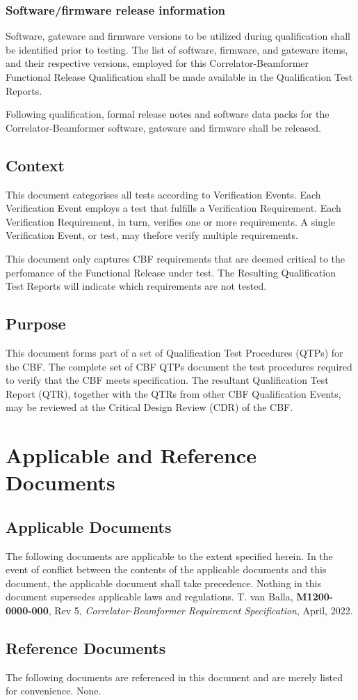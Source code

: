 \subsection{Software/firmware release information}
Software, gateware and firmware versions to be utilized during qualification shall be identified prior to testing. The list of software, firmware, and gateware items, and their respective versions, employed for this Correlator-Beamformer Functional Release Qualification shall be made available in the Qualification Test Reports.

Following qualification, formal release notes and software data packs for the Correlator-Beamformer software, gateware and firmware shall be released.
\section{Context}
This document categorises all tests according to Verification Events. Each Verification Event employs a test that fulfills a Verification Requirement. Each Verification Requirement, in turn, verifies one or more requirements. A single Verification Event, or test, may thefore verify multiple requirements.

This document only captures CBF requirements that are deemed critical to the perfomance of the Functional Release under test. The Resulting Qualification Test Reports will indicate which requirements are not tested.
\section{Purpose}
This document forms part of a set of Qualification Test Procedures (QTPs) for the CBF. The complete set of CBF QTPs document the test procedures required to verify that the CBF meets specification.
The resultant Qualification Test Report (QTR), together with the QTRs from other CBF Qualification Events, may be reviewed at the Critical Design Review (CDR) of the CBF.
\chapter{Applicable and Reference Documents}
\section{Applicable Documents}
The following documents are applicable to the extent specified herein. In the event of conflict between the contents of the applicable documents and this document, the applicable document shall take precedence.  Nothing in this document supersedes applicable laws and regulations.
\newline\newline
[1]\hspace{10mm} T. van Balla, {\bf M1200-0000-000}, Rev 5, {\it Correlator-Beamformer Requirement Specification}, April, 2022.
\section{Reference Documents}
The following documents are referenced in this document and are merely listed for convenience.\newline\newline
\hspace{10mm}None.
